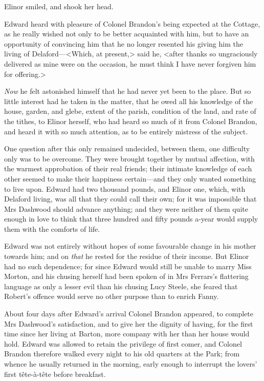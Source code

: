 Elinor smiled, and shook her head.

Edward heard with pleasure of Colonel Brandon's being expected at the Cottage, as he really wished not only to be better acquainted with him, but to have an opportunity of convincing him that he no longer resented his giving him the living of Delaford—<Which, at present,> said he, <after thanks so ungraciously delivered as mine were on the occasion, he must think I have never forgiven him for offering.>

\textit{Now} he felt astonished himself that he had never yet been to the place. But so little interest had he taken in the matter, that he owed all his knowledge of the house, garden, and glebe, extent of the parish, condition of the land, and rate of the tithes, to Elinor herself, who had heard so much of it from Colonel Brandon, and heard it with so much attention, as to be entirely mistress of the subject.

One question after this only remained undecided, between them, one difficulty only was to be overcome. They were brought together by mutual affection, with the warmest approbation of their real friends; their intimate knowledge of each other seemed to make their happiness certain—and they only wanted something to live upon. Edward had two thousand pounds, and Elinor one, which, with Delaford living, was all that they could call their own; for it was impossible that Mrs Dashwood should advance anything; and they were neither of them quite enough in love to think that three hundred and fifty pounds a-year would supply them with the comforts of life.

Edward was not entirely without hopes of some favourable change in his mother towards him; and on \textit{that} he rested for the residue of their income. But Elinor had no such dependence; for since Edward would still be unable to marry Miss Morton, and his chusing herself had been spoken of in Mrs Ferrars's flattering language as only a lesser evil than his chusing Lucy Steele, she feared that Robert's offence would serve no other purpose than to enrich Fanny.

About four days after Edward's arrival Colonel Brandon appeared, to complete Mrs Dashwood's satisfaction, and to give her the dignity of having, for the first time since her living at Barton, more company with her than her house would hold. Edward was allowed to retain the privilege of first comer, and Colonel Brandon therefore walked every night to his old quarters at the Park; from whence he usually returned in the morning, early enough to interrupt the lovers' first tête-à-tête before breakfast.

